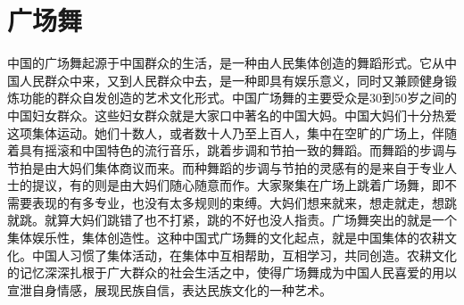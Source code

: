 \section{广场舞}

中国的广场舞起源于中国群众的生活，是一种由人民集体创造的舞蹈形式。它从中国人民群众中来，又到人民群众中去，是一种即具有娱乐意义，同时又兼顾健身锻炼功能的群众自发创造的艺术文化形式。中国广场舞的主要受众是30到50岁之间的中国妇女群众。这些妇女群众就是大家口中著名的中国大妈。中国大妈们十分热爱这项集体运动。她们十数人，或者数十人乃至上百人，集中在空旷的广场上，伴随着具有摇滚和中国特色的流行音乐，跳着步调和节拍一致的舞蹈。而舞蹈的步调与节拍是由大妈们集体商议而来。而种舞蹈的步调与节拍的灵感有的是来自于专业人士的提议，有的则是由大妈们随心随意而作。大家聚集在广场上跳着广场舞，即不需要表现的有多专业，也没有太多规则的束缚。大妈们想来就来，想走就走，想跳就跳。就算大妈们跳错了也不打紧，跳的不好也没人指责。广场舞突出的就是一个集体娱乐性，集体创造性。这种中国式广场舞的文化起点，就是中国集体的农耕文化。中国人习惯了集体活动，在集体中互相帮助，互相学习，共同创造。农耕文化的记忆深深扎根于广大群众的社会生活之中，使得广场舞成为中国人民喜爱的用以宣泄自身情感，展现民族自信，表达民族文化的一种艺术。